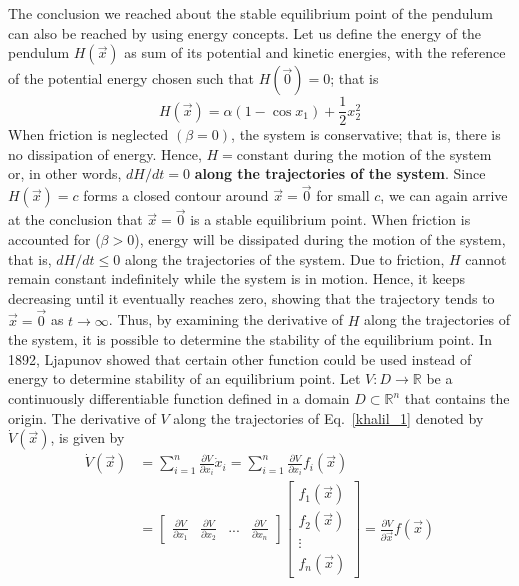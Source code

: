 \documentclass[11pt,a4paper,oneside]{book}
\numberwithin{equation}{section}
\theoremstyle{it}
\theoremstyle{definition}
\begin{document}
The conclusion we reached about the stable equilibrium point of the pendulum 
can also be reached by using energy concepts. Let us define the energy of the 
pendulum $H(\vec{x})$ as sum of its potential and kinetic energies, with the 
reference of the potential energy chosen such that $H(\vec{0})=0$; that is 
\begin{equation*}
	H(\vec{x}) = \alpha(1-\cos x_1) + \frac{1}{2}x_2^2 
\end{equation*}
When friction is neglected $(\beta=0)$, the system is conservative; that is, 
there is no dissipation of energy. Hence, $H = \text{constant}$ during the 
motion of the system or, in other words, ${dH}/{dt}=0$ \textbf{along the 
trajectories of the system}. Since $H(\vec{x})=c$ forms a closed contour around 
$\vec{x}=\vec{0}$ for small $c$, we can again arrive at the conclusion that 
$\vec{x}=\vec{0}$ is a stable equilibrium point. When friction is accounted for 
($\beta>0$), energy will be dissipated during the motion of the system, that 
is, ${dH}/{dt}\le0$ along the trajectories of the system. Due to friction, $H$ 
cannot remain constant indefinitely while the system is in motion. Hence, it 
keeps decreasing until it eventually reaches zero, showing that the trajectory 
tends to $\vec{x}=\vec{0}$ as $t\rightarrow\infty$. Thus, by examining the 
derivative of $H$ along the trajectories of the system, it is possible to 
determine the stability of the equilibrium point. In 1892, Ljapunov showed that 
certain other function could be used instead of energy to determine stability 
of an equilibrium point. Let $V:D\rightarrow\mathbb{R}$ be a continuously 
differentiable function defined in a domain $D\subset\mathbb{R}^n$ that 
contains the origin. The derivative of $V$ along the trajectories of 
Eq.~\eqref{khalil_1} denoted by $\dot{V}(\vec{x})$, is given by
\begin{equation}
	\begin{aligned}
		\dot{V}(\vec{x})&=\sum_{i=1}^{n}\frac{\partial V}{\partial 
		x_i}\dot{x}_i = \sum_{i=1}^{n}\frac{\partial V}{\partial 
		x_i}f_i(\vec{x}) \\[6pt]
		&= \begin{bmatrix} \frac{\partial V}{\partial x_1} & \frac{\partial 
		V}{\partial x_2} & ... & \frac{\partial V}{\partial x_n} \end{bmatrix} 
		\begin{bmatrix} f_1(\vec{x}) \\[6pt] f_2(\vec{x}) \\[6pt] \vdots 
		\\[6pt] f_n(\vec{x}) \end{bmatrix} = \frac{\partial V}{\partial 
		\vec{x}}f(\vec{x})
	\end{aligned}
\end{equation} 
\end{document}
